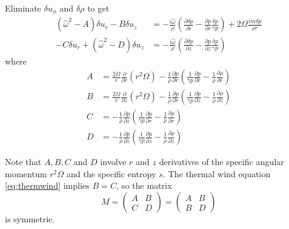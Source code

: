\documentclass{jknotes}
\begin{document}
Eliminate $\delta u_\phi$ and $\delta \rho$ to get
\begin{align}
	(\hat{\omega}^2 - A)\delta u_r - B \delta u_z &=
	-\frac{i\hat{\omega}}{\rho}\left(\frac{\partial \delta p}{\partial r} -
	\frac{\partial p}{\partial r} \frac{\delta p}{\gamma p}\right) + 2\Omega
	\frac{i m \delta p}{\rho r} \\
	-C\delta u_r + (\hat{\omega}^2 - D)\delta u_z &=
	-\frac{i\hat{\omega}}{\rho}\left(\frac{\partial \delta p}{\partial z} -
	\frac{\partial p}{\partial z} \frac{\delta p}{\gamma p}\right)
\end{align}
where
\begin{align}
	A &= \frac{2\Omega}{r}\frac{\partial}{\partial r}(r^2\Omega) -
	\frac{1}{\rho}\frac{\partial p}{\partial r} \left(\frac{1}{\gamma
	p}\frac{\partial p}{\partial r} - \frac{1}{\rho}\frac{\partial
	\rho}{\partial r}\right) \\
	B &= \frac{2\Omega}{r}\frac{\partial}{\partial z}(r^2\Omega) -
	\frac{1}{\rho}\frac{\partial p}{\partial r} \left(\frac{1}{\gamma
	p}\frac{\partial p}{\partial z} - \frac{1}{\rho}\frac{\partial
	\rho}{\partial z}\right) \\
	C &= -\frac{1}{\rho}\frac{\partial p}{\partial z} \left(\frac{1}{\gamma
	p}\frac{\partial p}{\partial r} - \frac{1}{\rho}\frac{\partial
	\rho}{\partial r}\right) \\
	D &= -\frac{1}{\rho}\frac{\partial p}{\partial z} \left(\frac{1}{\gamma
	p}\frac{\partial p}{\partial z} - \frac{1}{\rho}\frac{\partial
	\rho}{\partial z}\right)
\end{align}

Note that $A, B, C$ and $D$ involve $r$ and $z$ derivatives of the specific
angular momentum $r^2 \Omega$ and the specific entropy $s$. The thermal wind
equation \eqref{eq:thermwind} implies $B = C$, so the matrix
\begin{equation}
	M = \begin{pmatrix} A & B \\ C & D \end{pmatrix} = \begin{pmatrix} A & B
 	\\ B & D \end{pmatrix}
\end{equation}
is symmetric.
\end{document}

